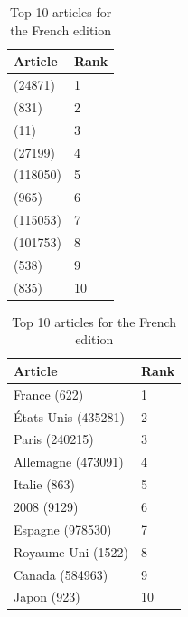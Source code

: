 \begin{table}[htbp]
    \begin{minipage}{.45\linewidth}
        \centering
        \begin{tabular}{ll}
            \toprule
            Article & Rank\\
            \midrule
            (24871) & 1\\
            (831) & 2\\
            (11) & 3\\
            (27199) & 4\\
            (118050) & 5\\
            (965) & 6\\
            (115053) & 7\\
            (101753) & 8\\
            (538) & 9\\
            (835) & 10\\
            \bottomrule
        \end{tabular}
        \caption{Top 10 articles for the Farsi edition}
    \end{minipage}
    \hfill
    \begin{minipage}{.45\linewidth}
        \centering
        \begin{tabular}{ll}
            \toprule
            Article & Rank\\
            \midrule
            France (622) & 1\\
            États-Unis (435281) & 2\\
            Paris (240215) & 3\\
            Allemagne (473091) & 4\\
            Italie (863) & 5\\
            2008 (9129) & 6\\
            Espagne (978530) & 7\\
            Royaume-Uni (1522) & 8\\
            Canada (584963) & 9\\
            Japon (923) & 10\\
            \bottomrule
        \end{tabular}
        \caption{Top 10 articles for the French edition}
    \end{minipage}
\end{table}
